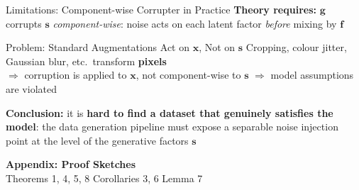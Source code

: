 \documentclass[aspectratio=169, 10pt]{beamer}
\begin{document}
\begin{frame}{Limitations: Component-wise Corrupter in Practice}
  \textbf{Theory requires:} $\mathbf{g}$ corrupts $\mathbf{s}$ \emph{component-wise}:
  noise acts on each latent factor \emph{before} mixing by $\mathbf{f}$

  \bigskip
  \begin{alertblock}{Problem: Standard Augmentations Act on $\mathbf{x}$, Not on $\mathbf{s}$}
    Cropping, colour jitter, Gaussian blur, etc.\ transform \textbf{pixels}\\
    $\Rightarrow$ corruption is applied to $\mathbf{x}$, not component-wise to $\mathbf{s}$
    $\Rightarrow$ model assumptions are violated
  \end{alertblock}

  \bigskip
  \textbf{Conclusion:} it is \textbf{hard to find a dataset that genuinely satisfies the model}:
  the data generation pipeline must expose a separable noise injection point at the level of
  the generative factors $\mathbf{s}$
\end{frame}

\appendix

\begin{frame}[plain]
  \centering\vfill
  {\Large\textbf{Appendix: Proof Sketches}}\\[1em]
  \normalsize
  Theorems 1, 4, 5, 8 \quad Corollaries 3, 6 \quad Lemma 7
  \vfill
\end{frame}
\end{document}
